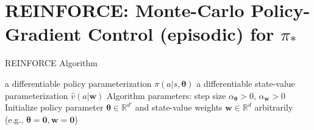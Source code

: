 \documentclass[../xlapes02]{subfiles}
\begin{document}


    \section{REINFORCE: Monte-Carlo Policy-Gradient Control (episodic) for $\pi_*$}
    \begin{algorithm}[h!]
        \caption{REINFORCE Algorithm}
        \label{alg:REINFORCE}

        a differentiable policy parameterization $\pi(a|s, \bm{\theta})$\;
        a differentiable state-value parameterization $\hat{v}(a|\bm{w})$\;
        Algorithm parameters: step size $\alpha_{\bm{\theta}} > 0$, $\alpha_{\bm{w}} > 0$\;
        Initialize policy parameter $\bm{\theta} \in \mathbb{R}^{d'}$ and state-value weights $\bm{w} \in \mathbb{R}^{d}$ arbitrarily (e.g., $\bm{\theta} = \bm{0}, \bm{w} = \bm{0}$)\;

    \end{algorithm}
\end{document}
